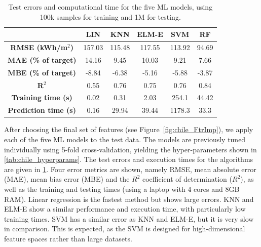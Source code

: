 \begin{table}[tb]
\centering
\footnotesize
\caption{Test errors and computational time for the five ML models, using 100k samples for training and 1M for testing.}
\label{tab:chile_results}
\begin{tabular}{cccccc}
\hline
\textbf{}                    & \textbf{LIN} & \textbf{KNN} & \textbf{ELM-E} & \textbf{SVM} & \textbf{RF} \\ \hline
\textbf{RMSE (kWh/m$^2$)}       & 157.03       & 115.48       & 117.55         & 113.92       & 94.69       \\
\textbf{MAE (\% of target)}  & 14.16        & 9.45         & 10.03          & 9.21         & 7.66        \\
\textbf{MBE (\% of target)}  & -8.84        & -6.38        & -5.16          & -5.88        & -3.87       \\
\textbf{R$^2$}                  & 0.55         & 0.76         & 0.75           & 0.76         & 0.84        \\
\textbf{Training time (s)}   & 0.02         & 0.31         & 2.03           & 254.1        & 44.42       \\
\textbf{Prediction time (s)} & 0.16         & 29.94        & 39.44          & 1178.3       & 33.3        \\ \hline
\end{tabular}
\end{table}

After choosing the final set of features (see Figure~\ref{fig:chile_FtrImp}), we apply each of the five ML models to the test data. The models are previously tuned individually using 5-fold cross-validation, yielding the hyper-parameters shown in \ref{tab:chile_hyperparams}. The test errors and execution times for the algorithms are given in \ref{tab:chile_results}. Four error metrics are shown, namely RMSE, mean absolute error (MAE), mean bias error (MBE) and the $R^2$ coefficient of determination ($R^2$), as well as the training and testing times (using a laptop with 4 cores and 8GB RAM). Linear regression is the fastest method but shows large errors. KNN and ELM-E show a similar performance and execution time, with particularly low training times. SVM has a similar error as KNN and ELM-E, but it is very slow in comparison. This is expected, as the SVM is designed for high-dimensional feature spaces rather than large datasets. 

